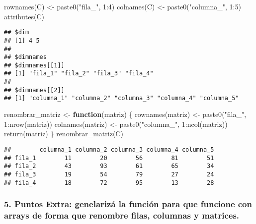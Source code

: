 \documentclass[
]{article}
\newenvironment{Shaded}{\begin{snugshade}}{\end{snugshade}}
\newcommand{\ControlFlowTok}[1]{\textcolor[rgb]{0.13,0.29,0.53}{\textbf{#1}}}
\newcommand{\DecValTok}[1]{\textcolor[rgb]{0.00,0.00,0.81}{#1}}
\newcommand{\FunctionTok}[1]{\textcolor[rgb]{0.00,0.00,0.00}{#1}}
\newcommand{\NormalTok}[1]{#1}
\newcommand{\OtherTok}[1]{\textcolor[rgb]{0.56,0.35,0.01}{#1}}
\newcommand{\SpecialCharTok}[1]{\textcolor[rgb]{0.00,0.00,0.00}{#1}}
\newcommand{\StringTok}[1]{\textcolor[rgb]{0.31,0.60,0.02}{#1}}
\begin{document}
\begin{Shaded}
\begin{Highlighting}[]
  \FunctionTok{rownames}\NormalTok{(C) }\OtherTok{\textless{}{-}} \FunctionTok{paste0}\NormalTok{(}\StringTok{"fila\_"}\NormalTok{, }\DecValTok{1}\SpecialCharTok{:}\DecValTok{4}\NormalTok{)}
  \FunctionTok{colnames}\NormalTok{(C) }\OtherTok{\textless{}{-}} \FunctionTok{paste0}\NormalTok{(}\StringTok{"columna\_"}\NormalTok{, }\DecValTok{1}\SpecialCharTok{:}\DecValTok{5}\NormalTok{)}
  \FunctionTok{attributes}\NormalTok{(C)}
\end{Highlighting}
\end{Shaded}

\begin{verbatim}
## $dim
## [1] 4 5
## 
## $dimnames
## $dimnames[[1]]
## [1] "fila_1" "fila_2" "fila_3" "fila_4"
## 
## $dimnames[[2]]
## [1] "columna_1" "columna_2" "columna_3" "columna_4" "columna_5"
\end{verbatim}

\begin{Shaded}
\begin{Highlighting}[]
\NormalTok{    renombrar\_matriz }\OtherTok{\textless{}{-}} \ControlFlowTok{function}\NormalTok{(matriz) \{}
      \FunctionTok{rownames}\NormalTok{(matriz) }\OtherTok{\textless{}{-}} \FunctionTok{paste0}\NormalTok{(}\StringTok{"fila\_"}\NormalTok{, }\DecValTok{1}\SpecialCharTok{:}\FunctionTok{nrow}\NormalTok{(matriz))}
      \FunctionTok{colnames}\NormalTok{(matriz) }\OtherTok{\textless{}{-}} \FunctionTok{paste0}\NormalTok{(}\StringTok{"columna\_"}\NormalTok{, }\DecValTok{1}\SpecialCharTok{:}\FunctionTok{ncol}\NormalTok{(matriz))}
      \FunctionTok{return}\NormalTok{(matriz)}
\NormalTok{    \}}
    \FunctionTok{renombrar\_matriz}\NormalTok{(C)}
\end{Highlighting}
\end{Shaded}

\begin{verbatim}
##        columna_1 columna_2 columna_3 columna_4 columna_5
## fila_1        11        20        56        81        51
## fila_2        43        93        61        65        34
## fila_3        19        54        79        27        24
## fila_4        18        72        95        13        28
\end{verbatim}

\hypertarget{puntos-extra-genelarizuxe1-la-funciuxf3n-para-que-funcione-con-arrays-de-forma-que-renombre-filas-columnas-y-matrices.}{%
\subsubsection{\texorpdfstring{5. \textbf{Puntos Extra}: genelarizá la
función para que funcione con arrays de forma que renombre filas,
columnas y
matrices.}{5. Puntos Extra: genelarizá la función para que funcione con arrays de forma que renombre filas, columnas y matrices.}}\label{puntos-extra-genelarizuxe1-la-funciuxf3n-para-que-funcione-con-arrays-de-forma-que-renombre-filas-columnas-y-matrices.}}
\end{document}
